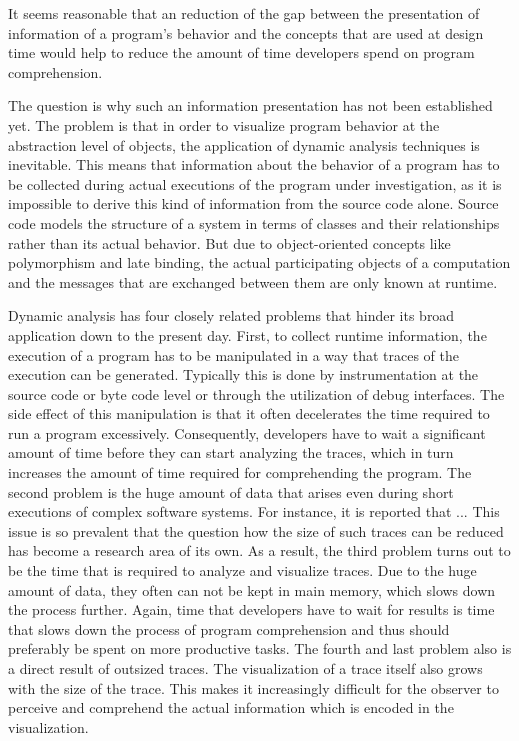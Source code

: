 It seems reasonable that an reduction of the gap between the presentation of information of a program's behavior and the concepts that are used at design time would help to reduce the amount of time developers spend on program comprehension.


The question is why such an information presentation has not been established yet.
The problem is that in order to visualize program behavior at the abstraction level of objects, the application of dynamic analysis techniques is inevitable.
This means that information about the behavior of a program has to be collected during actual executions of the program under investigation, as it is impossible to derive this kind of information from the source code alone.
Source code models the structure of a system in terms of classes and their relationships rather than its actual behavior.
But due to object-oriented concepts like polymorphism and late binding, the actual participating objects of a computation and the messages that are exchanged between them are only known at runtime.

Dynamic analysis has four closely related problems that hinder its broad application down to the present day.
First, to collect runtime information, the execution of a program has to be manipulated in a way that traces of the execution can be generated.
Typically this is done by instrumentation at the source code or byte code level or through the utilization of debug interfaces.
The side effect of this manipulation is that it often decelerates the time required to run a program excessively.
Consequently, developers have to wait a significant amount of time before they can start analyzing the traces, which in turn increases the amount of time required for comprehending the program.
The second problem is the huge amount of data that arises even during short executions of complex software systems.
For instance, it is reported that ...
This issue is so prevalent that the question how the size of such traces can be reduced  has become a research area of its own.
As a result, the third problem turns out to be the time that is required to analyze and visualize traces.
Due to the huge amount of data, they often can not be kept in main memory, which slows down the process further.
Again, time that developers have to wait for results is time that slows down the process of program comprehension and thus should preferably be spent on more productive tasks.
The fourth and last problem also is a direct result of outsized traces.
The visualization of a trace itself also grows with the size of the trace.
This makes it increasingly difficult for the observer to perceive and comprehend the actual information which is encoded in the visualization.

